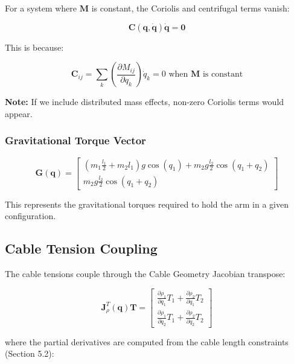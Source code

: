 For a system where $\mathbf{M}$ is constant, the Coriolis and centrifugal terms vanish:

\begin{equation}
\mathbf{C}(\mathbf{q}, \dot{\mathbf{q}}) \dot{\mathbf{q}} = \mathbf{0}
\end{equation}

This is because:

\begin{equation}
\mathbf{C}_{ij} = \sum_{k} \left(\frac{\partial M_{ij}}{\partial q_k}\right) \dot{q}_k = 0 \text{ when } \mathbf{M} \text{ is constant}
\end{equation}

\textbf{Note:} If we include distributed mass effects, non-zero Coriolis terms would appear.

\subsubsection{Gravitational Torque Vector}

\begin{equation}
\mathbf{G}(\mathbf{q}) = \begin{bmatrix}
\left(m_1 \frac{l_1}{2} + m_2 l_1\right) g \cos(q_1) + m_2 g \frac{l_2}{2} \cos(q_1 + q_2) \\
m_2 g \frac{l_2}{2} \cos(q_1 + q_2)
\end{bmatrix}
\end{equation}

This represents the gravitational torques required to hold the arm in a given configuration.

\subsection{Cable Tension Coupling}

The cable tensions couple through the Cable Geometry Jacobian transpose:

\begin{equation}
\mathbf{J}_{\rho}^T(\mathbf{q}) \mathbf{T} = \begin{bmatrix}
\frac{\partial \rho_1}{\partial q_1} T_1 + \frac{\partial \rho_2}{\partial q_1} T_2 \\
\frac{\partial \rho_1}{\partial q_2} T_1 + \frac{\partial \rho_2}{\partial q_2} T_2
\end{bmatrix}
\end{equation}

where the partial derivatives are computed from the cable length constraints (Section 5.2):

